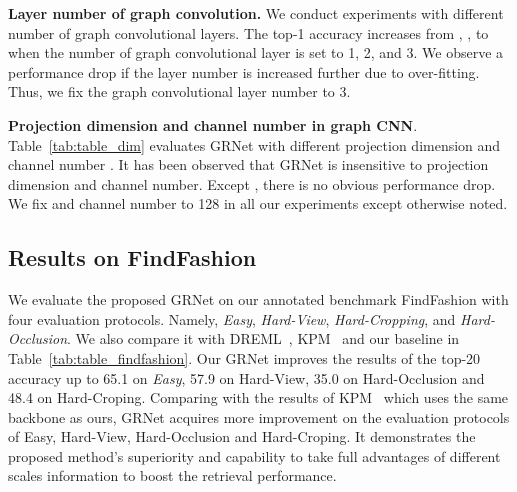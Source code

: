 \documentclass[10pt,twocolumn,letterpaper]{article}
\begin{document}
\textbf{Layer number of graph convolution.} We conduct experiments  with different number of graph convolutional layers. The top-1 accuracy increases from , , to  when the number of graph convolutional layer is set to 1, 2, and 3. We observe a performance drop if the layer number is increased further due to over-fitting.
Thus, we fix the graph convolutional layer number to 3.





\textbf{Projection dimension and channel number in graph CNN}. Table~\ref{tab:table_dim} evaluates GRNet with different projection dimension  and channel number . It has been observed that GRNet is insensitive to projection dimension and channel number. Except
, there is no obvious performance drop.  We fix  and channel number  to 128 in all our experiments except otherwise noted.

\subsection{Results on FindFashion}
We evaluate the proposed GRNet on our annotated benchmark FindFashion with four evaluation protocols. Namely, \textit{Easy}, \textit{Hard-View}, \textit{Hard-Cropping}, and \textit{Hard-Occlusion}. We also compare it with DREML~\cite{Xuan2018}, KPM~\cite{Shen_2018_CVPR} and our baseline in Table~\ref{tab:table_findfashion}.
Our GRNet improves the results of the top-20 accuracy up to 65.1 on \textit{Easy}, 57.9 on Hard-View, 35.0 on Hard-Occlusion and 48.4 on Hard-Croping.
Comparing with the results of KPM~\cite{Shen_2018_CVPR} which uses the same backbone as ours, GRNet acquires more improvement on the evaluation protocols of Easy, Hard-View, Hard-Occlusion and  Hard-Croping.
It demonstrates the proposed method's superiority and capability to take full advantages of different scales information to boost the retrieval performance.
\end{document}
